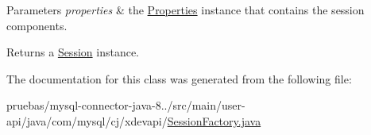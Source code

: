 \begin{DoxyParams}{Parameters}
{\em properties} & the \mbox{\hyperlink{}{Properties}} instance that contains the session components. \\
\hline
\end{DoxyParams}
\begin{DoxyReturn}{Returns}
a \mbox{\hyperlink{interfacecom_1_1mysql_1_1cj_1_1xdevapi_1_1_session}{Session}} instance. 
\end{DoxyReturn}


The documentation for this class was generated from the following file\+:\begin{DoxyCompactItemize}
\item 
pruebas/mysql-\/connector-\/java-\/8../src/main/user-\/api/java/com/mysql/cj/xdevapi/\mbox{\hyperlink{_session_factory_8java}{Session\+Factory.\+java}}\end{DoxyCompactItemize}
